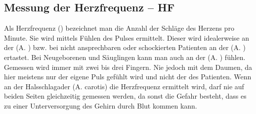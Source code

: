 


\subsection{Messung der Herzfrequenz -- HF}

Als Herzfrequenz () bezeichnet man die Anzahl der
Schläge des Herzens pro Minute. Sie wird mittels Fühlen des Pulses
ermittelt. Dieser wird idealerweise an der
 (A. ) bzw. bei nicht
ansprechbaren oder schockierten Patienten an der
 (A. ) ertastet. Bei
Neugeborenen und Säuglingen kann man auch an der
 (A. ) fühlen. Gemessen
wird immer mit zwei bis drei Fingern. Nie jedoch mit dem Daumen, da hier meistens nur der eigene Puls gefühlt wird und nicht der des
Patienten. Wenn an der Halsschlagader (A. carotis) die
Herzfrequenz ermittelt wird, darf nie auf beiden Seiten
gleichzeitig gemessen werden, da sonst die Gefahr besteht,
dass es zu einer Unterversorgung des Gehirn durch Blut kommen
kann.

